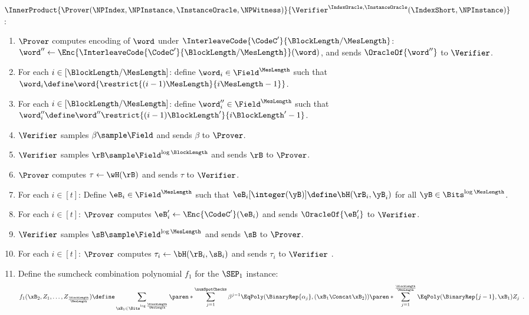    \begin{tcolorbox}[breakable, enhanced, colback=white, boxrule=0.65pt]
    \noindent
    $\InnerProduct{\Prover(\NPIndex, \NPInstance, \InstanceOracle, \NPWitness)}{\Verifier^{\IndexOracle, \InstanceOracle}(\IndexShort, \NPInstance)}$:
    \begin{enumerate}[nolistsep]
        \item $\Prover$ computes encoding of $\word$ under $\InterleaveCode{\CodeC'}{\BlockLength/\MesLength}$: $\word'' \gets \Enc{\InterleaveCode{\CodeC'}{\BlockLength/\MesLength}}(\word)$, and sends $\OracleOf{\word''}$ to $\Verifier$.
        \item For each $i \in [\BlockLength/\MesLength]$: define $\word_i \in \Field^{\MesLength}$ such that $\word_i \define \word{\restrict{(i-1) \MesLength}{i \MesLength-1}}$.
        \item For each $i \in [\BlockLength/\MesLength]$: define $\word_i'' \in \Field^{\MesLength}$ such that $\word''_i \define \word''{\restrict{(i-1) \BlockLength'}{i \BlockLength'-1}}$.
        \item $\Verifier$ samples $\beta \sample \Field$ and sends $\beta$ to $\Prover$.
        \item $\Verifier$ samples $\rB \sample \Field^{\log \BlockLength}$ and sends $\rB$ to $\Prover$.
        \item $\Prover$ computes $\tau \gets \wH(\rB)$ and sends $\tau$ to $\Verifier$.
        \item For each $i \in [t]$: Define $\eB_i \in \Field^{\MesLength}$ such that $\eB_i[\integer(\yB)] \define \bH(\rB_i, \yB_i)$ for all $\yB \in \Bits^{\log \MesLength}$.
        \item For each $i \in [t]$: $\Prover$ computes $\eB'_i \gets \Enc{\CodeC'}(\eB_i)$ and sends $\OracleOf{\eB'_i}$ to $\Verifier$.
        \item $\Verifier$ samples $\sB \sample \Field^{\log \MesLength}$ and sends $\sB$ to $\Prover$.
        \item For each $i \in [t]$: $\Prover$ computes $\tau_i \gets \bH(\rB_i, \sB_i)$ and sends $\tau_i$ to $\Verifier$ .
        \item Define the sumcheck combination polynomial $f_1$ for the $\SEP_1$ instance:
        \begin{align*}
            f_1(\xB_2, Z_1, \dotsc, Z_{\frac{\BlockLength}{\MesLength}}) \define \sum_{\xB_1 \in \Bits^{\log \frac{\BlockLength}{\MesLength}}} \paren*{\sum_{j=1}^{\numSpotChecks} \beta^{j-1} \EqPoly(\BinaryRep{\alpha_j}, (\xB_1\Concat\xB_2))} \paren*{\sum_{j=1}^{\frac{\BlockLength}{\MesLength}} \EqPoly(\BinaryRep{j-1}, \xB_1)Z_j} \enspace.

\end{align*}
\end{enumerate}
\end{tcolorbox}
